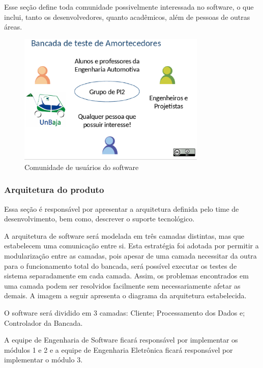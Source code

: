 	Esse seção define toda comunidade possivelmente interessada no software, o que inclui, tanto os desenvolvedores, quanto acadêmicos, além de pessoas de outras áreas.

	\begin{figure}[h]
		\centering
		\includegraphics[width=0.8\textwidth]{figuras/usuarios.eps}
		\caption{Comunidade de usuários do software}
		\label{img:usuarios}
	\end{figure}


\subsubsection{Arquitetura do produto}

	Essa seção é responsável por apresentar a arquitetura definida pelo time de desenvolvimento, bem como, descrever o suporte tecnológico.

	A arquitetura de software será modelada em três camadas distintas, mas que estabelecem uma comunicação entre si. Esta estratégia foi adotada por permitir a modularização entre as camadas, pois apesar de uma camada necessitar da outra para o funcionamento total do bancada, será possível executar os testes de sistema separadamente em cada camada. Assim, os problemas encontrados em uma camada podem ser resolvidos facilmente sem necessariamente afetar as demais. A imagem a seguir apresenta o diagrama da arquitetura estabelecida.


	O software será dividido em 3 camadas:
	Cliente;
	Processamento dos Dados e;
	Controlador da Bancada.

	A equipe de Engenharia de Software ficará responsável por implementar os módulos 1 e 2 e a equipe de Engenharia Eletrônica ficará responsável por implementar o módulo 3.

